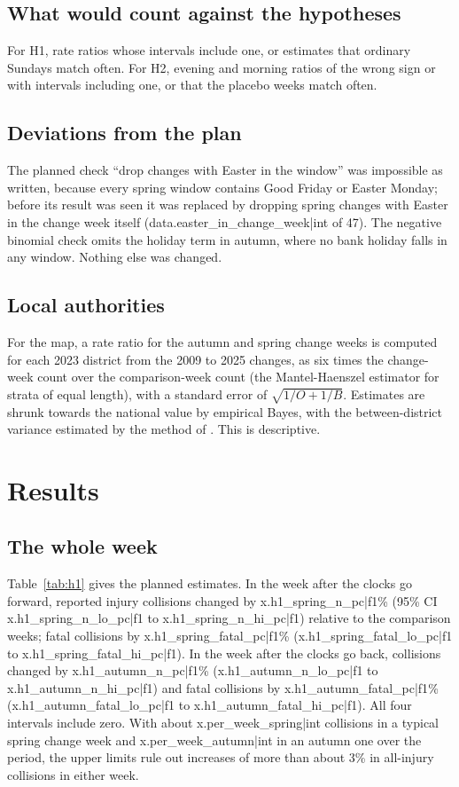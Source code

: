 \documentclass[11pt,a4paper]{article}
\begin{document}
\subsection{What would count against the hypotheses}
For H1, rate ratios whose intervals include one, or estimates that ordinary Sundays match often. For H2, evening and morning ratios of the wrong sign or with intervals including one, or that the placebo weeks match often.

\subsection{Deviations from the plan}\label{sec:dev}
The planned check ``drop changes with Easter in the window'' was impossible as written, because every spring window contains Good Friday or Easter Monday; before its result was seen it was replaced by dropping spring changes with Easter in the change week itself ({{data.easter_in_change_week|int}} of 47). The negative binomial check omits the holiday term in autumn, where no bank holiday falls in any window. Nothing else was changed.

\subsection{Local authorities}
For the map, a rate ratio for the autumn and spring change weeks is computed for each 2023 district from the 2009 to 2025 changes, as six times the change-week count over the comparison-week count (the Mantel-Haenszel estimator for strata of equal length), with a standard error of $\sqrt{1/O + 1/B}$. Estimates are shrunk towards the national value by empirical Bayes, with the between-district variance estimated by the method of \citet{dersimonian1986}. This is descriptive.

\section{Results}\label{sec:results}
\subsection{The whole week}
Table~\ref{tab:h1} gives the planned estimates. In the week after the clocks go forward, reported injury collisions changed by {{x.h1_spring_n_pc|f1}}\% (95\% CI {{x.h1_spring_n_lo_pc|f1}} to {{x.h1_spring_n_hi_pc|f1}}) relative to the comparison weeks; fatal collisions by {{x.h1_spring_fatal_pc|f1}}\% ({{x.h1_spring_fatal_lo_pc|f1}} to {{x.h1_spring_fatal_hi_pc|f1}}). In the week after the clocks go back, collisions changed by {{x.h1_autumn_n_pc|f1}}\% ({{x.h1_autumn_n_lo_pc|f1}} to {{x.h1_autumn_n_hi_pc|f1}}) and fatal collisions by {{x.h1_autumn_fatal_pc|f1}}\% ({{x.h1_autumn_fatal_lo_pc|f1}} to {{x.h1_autumn_fatal_hi_pc|f1}}). All four intervals include zero. With about {{x.per_week_spring|int}} collisions in a typical spring change week and {{x.per_week_autumn|int}} in an autumn one over the period, the upper limits rule out increases of more than about 3\% in all-injury collisions in either week.
\end{document}
